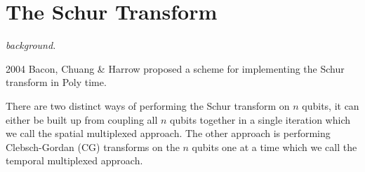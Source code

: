 \section{The Schur Transform}

\textit{background.}

2004 Bacon, Chuang \& Harrow proposed a scheme for implementing the Schur transform in Poly time. 

There are two distinct ways of performing the Schur transform on $n$ qubits, it can either be built up from coupling all $n$ qubits together in a single iteration which we call the spatial multiplexed approach. The other approach is performing Clebsch-Gordan (CG) transforms on the $n$ qubits one at a time which we call the temporal multiplexed approach.  
